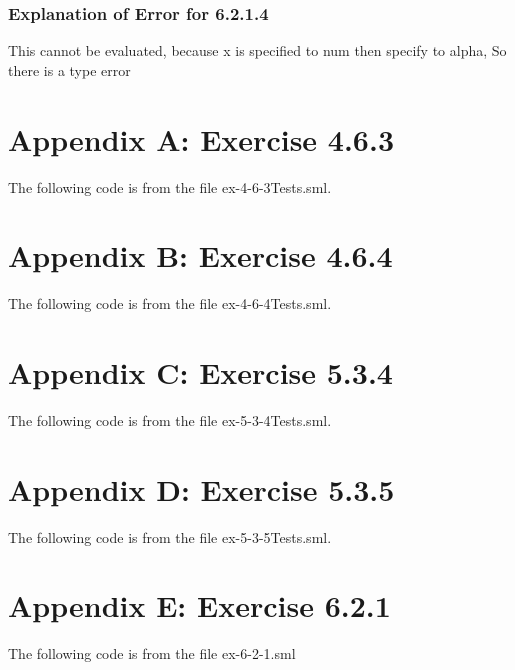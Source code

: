 \documentclass{report}
\begin{document}
\subsection{Explanation of Error for 6.2.1.4}
\label{sec:error-explanation}
 This cannot be evaluated, because x is specified to num then specify to alpha, So there is a type error

\chapter{Appendix A: Exercise 4.6.3}
\label{cha:appendix-a:-exercise463}

The following code is from the file ex-4-6-3Tests.sml.


\chapter{Appendix B: Exercise 4.6.4}
\label{cha:appendix-a:-exercise464}

The following code is from the file ex-4-6-4Tests.sml.


\chapter{Appendix C: Exercise 5.3.4}
\label{cha:appendix-a:-exercise534}

The following code is from the file ex-5-3-4Tests.sml.


\chapter{Appendix D: Exercise 5.3.5}
\label{cha:appendix-a:-exercise535}

The following code is from the file ex-5-3-5Tests.sml.


\chapter{Appendix E: Exercise 6.2.1}
\label{cha:appendix-e:-exercise621}

The following code is from the file ex-6-2-1.sml

\end{document}
